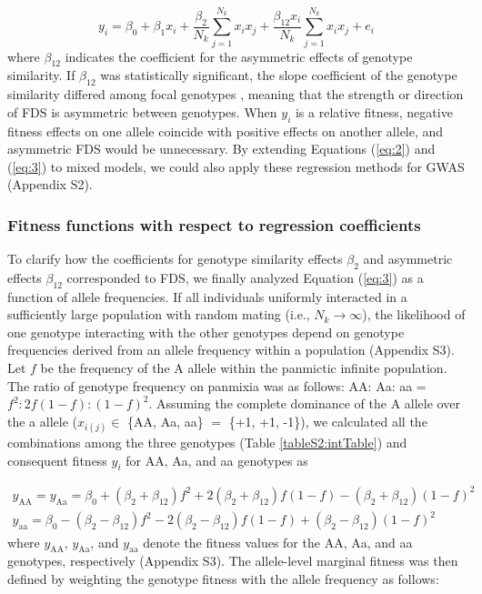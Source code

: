 \documentclass[12pt,]{article}
\begin{document}
\begin{equation}
y_i = \beta_0 + \beta_1x_i + \frac{\beta_2}{N_k}\sum^{N_{k}}_{j=1}{x_ix_j} + \frac{\beta_{12}x_i}{N_k}\sum^{N_{k}}_{j=1}{x_ix_j} + e_i \label{eq:3}
\end{equation}
\noindent
where $\beta_{12}$ indicates the coefficient for the asymmetric effects of genotype similarity. If $\beta_{12}$ was statistically significant, the slope coefficient of the genotype similarity differed among focal genotypes \citep{sato2019neighbor}, meaning that the strength or direction of FDS is asymmetric between genotypes. When $y_i$ is a relative fitness, negative fitness effects on one allele coincide with positive effects on another allele, and asymmetric FDS would be unnecessary. By extending Equations (\ref{eq:2}) and (\ref{eq:3}) to mixed models, we could also apply these regression methods for GWAS (Appendix S2).


\subsubsection{Fitness functions with respect to regression coefficients}
To clarify how the coefficients for genotype similarity effects $\beta_2$ and asymmetric effects $\beta_{12}$ corresponded to FDS, we finally analyzed Equation (\ref{eq:3}) as a function of allele frequencies. If all individuals uniformly interacted in a sufficiently large population with random mating (i.e., $N_k \to \infty$), the likelihood of one genotype interacting with the other genotypes depend on genotype frequencies derived from an allele frequency within a population (Appendix S3). Let $f$ be the frequency of the A allele within the panmictic infinite population. The ratio of genotype frequency on panmixia was as follows: AA: Aa: aa = $f^2:2f(1-f):(1-f)^2$. Assuming the complete dominance of the A allele over the a allele ($x_{i(j)} \in$ \{AA, Aa, aa\} $=$ \{+1, +1, -1\}), we calculated all the combinations among the three genotypes (Table \ref{tableS2:intTable}) and consequent fitness $y_i$ for AA, Aa, and aa genotypes as

\begin{subequations}
\begin{align}
y_\mathrm{AA} = y_\mathrm{Aa} = \beta_0 + (\beta_2 + \beta_{12})f^2 + 2(\beta_2 + \beta_{12}) f(1-f) - (\beta_2 + \beta_{12})(1-f)^2 \label{eq:4a} \\
y_\mathrm{aa} = \beta_0 - (\beta_2 - \beta_{12}) f^2 - 2(\beta_2 - \beta_{12})f(1-f) + (\beta_2 - \beta_{12})(1-f)^2 \label{eq:4b}
\end{align}
\end{subequations}
\noindent
where $y_\mathrm{AA}$, $y_\mathrm{Aa}$, and $y_\mathrm{aa}$ denote the fitness values for the AA, Aa, and aa genotypes, respectively (Appendix S3). The allele-level marginal fitness was then defined by weighting the genotype fitness with the allele frequency as follows:
\end{document}

